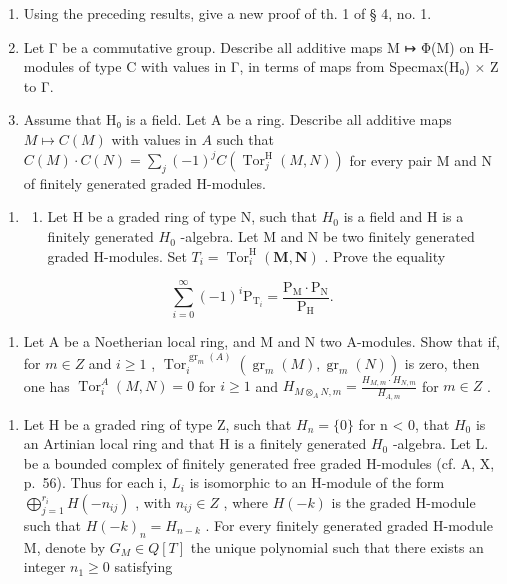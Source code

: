 \begin{enumerate}
\def\labelenumi{\alph{enumi})}
\setcounter{enumi}{6}
\tightlist
\item
  Using the preceding results, give a new proof of th. 1 of § 4, no. 1.
\item
  Let Γ be a commutative group. Describe all additive maps M ↦ Φ(M) on H-modules of type C with values in Γ, in terms of maps from Specmax(H₀) × Z to Γ.
\item
  Assume that H₀ is a field. Let A be a ring. Describe all additive maps \(M\mapsto C(M)\) with values in \(A\) such that \(C(M)\cdot C(N) = \sum_j(-1)^j C(\operatorname{Tor}_{j}^{\mathrm{H}}(M,N))\) for every pair M and N of finitely generated graded H-modules.
\end{enumerate}

\begin{enumerate}
\def\labelenumi{\arabic{enumi})}
\setcounter{enumi}{4}
\tightlist
\item
  \begin{enumerate}
  \def\labelenumii{\alph{enumii})}
  \tightlist
  \item
    Let H be a graded ring of type N, such that \(H_{0}\) is a field and H is a finitely generated \(H_{0}\) -algebra. Let M and N be two finitely generated graded H-modules. Set \(T_{i} = \operatorname{Tor}_{i}^{\mathrm{H}}(\mathbf{M}, \mathbf{N})\) . Prove the equality
  \end{enumerate}
\end{enumerate}

\[
\sum_ {i = 0} ^ {\infty} (- 1) ^ {i} \mathrm{P} _ {\mathrm{T} _ {i}} = \frac {\mathrm{P} _ {\mathrm{M}} \cdot \mathrm{P} _ {\mathrm{N}}}{\mathrm{P} _ {\mathrm{H}}}.
\]

\begin{enumerate}
\def\labelenumi{\alph{enumi})}
\setcounter{enumi}{1}
\tightlist
\item
  Let A be a Noetherian local ring, and M and N two A-modules. Show that if, for \(m \in Z\) and \(i \geqslant 1\) , \(\operatorname{Tor}_{i}^{\operatorname{gr}_{m}(A)}(\operatorname{gr}_{m}(M), \operatorname{gr}_{m}(N))\) is zero, then one has \(\operatorname{Tor}_{i}^{A}(M, N) = 0\) for \(i \geqslant 1\) and \(H_{M \otimes_{A} N, m} = \frac{H_{M, m} \cdot H_{N, m}}{H_{A, m}}\) for \(m \in Z\) .
\end{enumerate}

\begin{enumerate}
\def\labelenumi{\arabic{enumi})}
\setcounter{enumi}{5}
\tightlist
\item
  Let H be a graded ring of type Z, such that \(H_{n} = \{0\}\) for n \textless{} 0, that \(H_{0}\) is an Artinian local ring and that H is a finitely generated \(H_{0}\) -algebra. Let L. be a bounded complex of finitely generated free graded H-modules (cf. A, X, p.~56). Thus for each i, \(L_{i}\) is isomorphic to an H-module of the form \(\bigoplus_{j=1}^{r_{i}} H(-n_{ij})\) , with \(n_{ij} \in Z\) , where \(H(-k)\) is the graded H-module such that \(H(-k)_{n} = H_{n-k}\) . For every finitely generated graded H-module M, denote by \(G_{M} \in Q[T]\) the unique polynomial such that there exists an integer \(n_{1} \geqslant 0\) satisfying
\end{enumerate}

